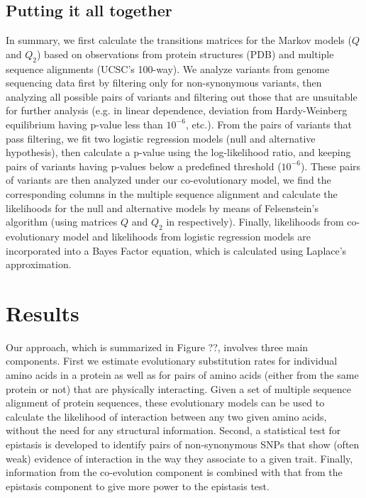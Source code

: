 \subsection{Putting it all together}

In summary, we first calculate the transitions matrices for the Markov models ($Q$ and $Q_2$) based on observations from protein structures (PDB) and multiple sequence alignments (UCSC's 100-way). We analyze variants from genome sequencing data first by filtering only for non-synonymous variants, then analyzing all possible pairs of variants and filtering out those that are unsuitable for further analysis (e.g. in linear dependence, deviation from Hardy-Weinberg equilibrium having p-value less than $10^{-6}$, etc.). From the pairs of variants that pass filtering, we fit two logistic regression models (null and alternative hypothesis), then calculate a p-value using the log-likelihood ratio, and keeping pairs of variants having p-values below a predefined threshold ($10^{-6}$). These pairs of variants are then analyzed under our co-evolutionary model, we find the corresponding columns in the multiple sequence alignment and calculate the likelihoods for the null and alternative models by means of Felsenstein's algorithm (using matrices $Q$ and $Q_2$ in respectively). Finally, likelihoods from co-evolutionary model and likelihoods from logistic regression models are incorporated into a Bayes Factor equation, which is calculated using Laplace's approximation.

\section{Results}

Our approach, which is summarized in Figure ??, involves three main components. First we estimate evolutionary substitution rates for individual amino acids in a protein as well as for pairs of amino acids (either from the same protein or not) that are physically interacting. Given a set of multiple sequence alignment of protein sequences, these evolutionary models can be used to calculate the likelihood of interaction between any two given amino acids, without the need for any structural information. Second, a statistical test for epistasis is developed to identify pairs of non-synonymous SNPs that show (often weak) evidence of interaction in the way they associate to a given trait. Finally, information from the co-evolution component is combined with that from the epistasis component to give more power to the epistasis test.
 

